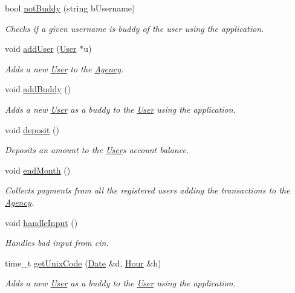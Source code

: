 \begin{Indent}
\begin{DoxyCompactItemize}
bool \hyperlink{group___agency_ga9cbd4d4f5f20f6ec9e3d3088cf61f96a}{not\+Buddy} (string b\+Username)
\begin{DoxyCompactList}\small\item\em Checks if a given username is buddy of the user using the application. \end{DoxyCompactList}\item 
void \hyperlink{group___agency_ga9307d4ce4dd311f5744592248be6c9e5}{add\+User} (\hyperlink{class_user}{User} $\ast$u)
\begin{DoxyCompactList}\small\item\em Adds a new \hyperlink{class_user}{User} to the \hyperlink{class_agency}{Agency}. \end{DoxyCompactList}\item 
void \hyperlink{group___agency_ga56bbae6923a8e9414085ffb23e644d53}{add\+Buddy} ()
\begin{DoxyCompactList}\small\item\em Adds a new \hyperlink{class_user}{User} as a buddy to the \hyperlink{class_user}{User} using the application. \end{DoxyCompactList}\item 
void \hyperlink{group___agency_gaa76bfa288699a10c82a04db205bc56d6}{deposit} ()
\begin{DoxyCompactList}\small\item\em Deposits an amount to the \hyperlink{class_user}{User}\textquotesingle{}s account balance. \end{DoxyCompactList}\item 
void \hyperlink{group___agency_ga69f9b0bc4960edabb2c3342586069da2}{end\+Month} ()
\begin{DoxyCompactList}\small\item\em Collects payments from all the registered users adding the transactions to the \hyperlink{class_agency}{Agency}. \end{DoxyCompactList}\item 
void \hyperlink{group___agency_gaf0d57adbab935cd35d4e49f29e4abc0c}{handle\+Input} ()
\begin{DoxyCompactList}\small\item\em Handles bad input from cin. \end{DoxyCompactList}\item 
time\+\_\+t \hyperlink{group___agency_ga00fdbd79de096b13dd0033478552164a}{get\+Unix\+Code} (\hyperlink{class_date}{Date} \&d, \hyperlink{class_hour}{Hour} \&h)
\begin{DoxyCompactList}\small\item\em Adds a new \hyperlink{class_user}{User} as a buddy to the \hyperlink{class_user}{User} using the application. \end{DoxyCompactList}\end{DoxyCompactItemize}
\end{Indent}
